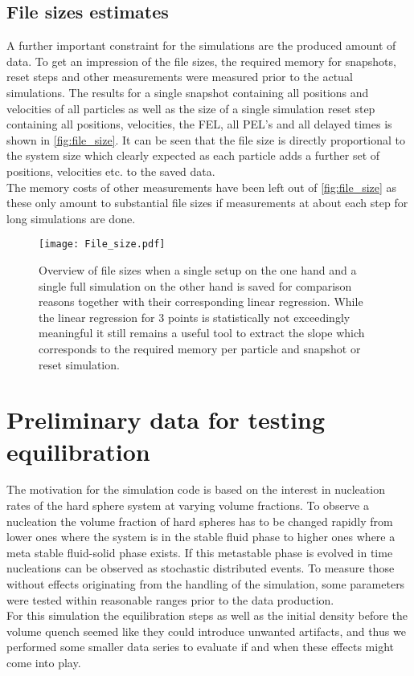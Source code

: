 \subsection{File sizes estimates}
\label{sec:file_size}
A further important constraint for the simulations are the produced amount of data. To get an impression of the file sizes, the required memory for snapshots, reset steps and other measurements were measured prior to the actual simulations. The results for a single snapshot containing all positions and velocities of all particles as well as the size of a single simulation reset step containing all positions, velocities, the FEL, all PEL's and all delayed times is shown in \autoref{fig:file_size}. It can be seen that the file size is directly proportional to the system size which clearly expected as each particle adds a further set of positions, velocities etc. to the saved data.\\
The memory costs of other measurements have been left out of \autoref{fig:file_size} as these only amount to substantial file sizes if measurements at about each step for long simulations are done.\\  

\begin{figure}[h!]
\centering
\texttt{[image: File\_size.pdf]}
\caption[File size estimate]{Overview of file sizes when a single setup on the one hand and a single full simulation on the other hand is saved for comparison reasons together with their corresponding linear regression. While the linear regression for 3 points is statistically not exceedingly meaningful it still remains a useful tool to extract the slope which corresponds to the required memory per particle and snapshot or reset simulation.}
\label{fig:file_size}
\end{figure}




\section{Preliminary data for testing equilibration}
\label{sec:data}
The motivation for the simulation code is based on the interest in nucleation rates of the hard sphere system at varying volume fractions. To observe a nucleation the volume fraction of hard spheres has to be changed rapidly from lower ones where the system is in the stable fluid phase to higher ones where a meta stable fluid-solid phase exists. If this metastable phase is evolved in time nucleations can be observed as stochastic distributed events. To measure those without effects originating from the handling of the simulation, some parameters were tested within reasonable ranges prior to the data production.\\
For this simulation the equilibration steps as well as the initial density before the volume quench seemed like they could introduce unwanted artifacts, and thus we performed some smaller data series to evaluate if and when these effects might come into play.\\

